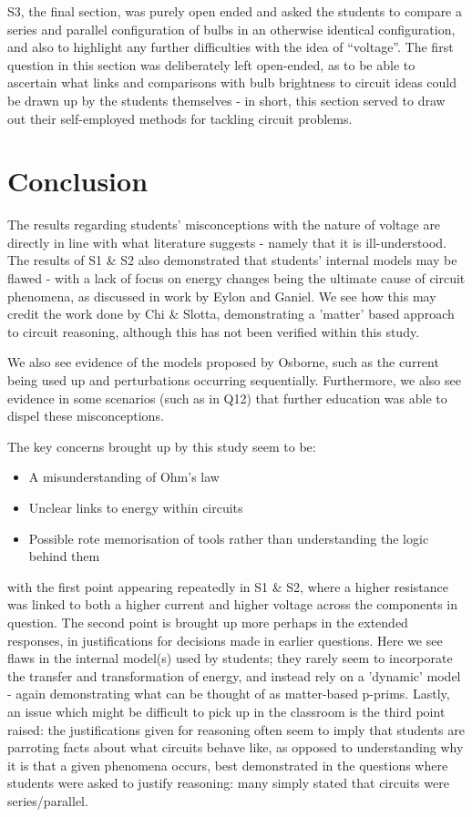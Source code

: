 \documentclass[a4paper,openany,nobib]{tufte-book}
\begin{document}
S3, the final section, was purely open ended and asked the students to compare a series and parallel configuration of bulbs in an otherwise identical configuration, and also to highlight any further difficulties with the idea of ``voltage''.
The first question in this section was deliberately left open-ended, as to be able to ascertain what links and comparisons with bulb brightness to circuit ideas could be drawn up by the students themselves - in short, this section served to draw out their self-employed methods for tackling circuit problems.
\chapter{Conclusion}%

The results regarding students' misconceptions with the nature of voltage are directly in line with what literature suggests - namely that it is ill-understood. The results of S1 \& S2 also demonstrated that students' internal models may be flawed - with a lack of focus on energy changes being the ultimate cause of circuit phenomena, as discussed in work by Eylon and Ganiel. We see how this may credit the work done by Chi \& Slotta, demonstrating a 'matter' based approach to circuit reasoning, although this has not been verified within this study.

We also see evidence of the models proposed by Osborne, such as the current being used up and perturbations occurring sequentially. Furthermore, we also see evidence in some scenarios (such as in Q12) that further education was able to dispel these misconceptions.

The key concerns brought up by this study seem to be:
\begin{itemize}
	\item A misunderstanding of Ohm's law
	\item Unclear links to energy within circuits
	\item Possible rote memorisation of tools rather than understanding the logic behind them
\end{itemize}
with the first point appearing repeatedly in S1 \& S2, where a higher resistance was linked to both a higher current and higher voltage across the components in question.
The second point is brought up more perhaps in the extended responses, in justifications for decisions made in earlier questions. Here we see flaws in the internal model(s) used by students; they rarely seem to incorporate the transfer and transformation of energy, and instead rely on a 'dynamic' model - again demonstrating what can be thought of as matter-based p-prims.
Lastly, an issue which might be difficult to pick up in the classroom is the third point raised: the justifications given for reasoning often seem to imply that students are parroting facts about what circuits behave like,
as opposed to understanding why it is that a given phenomena occurs, best demonstrated in the questions where students were asked to justify reasoning: many simply stated that circuits were series/parallel.
\end{document}
